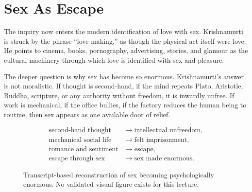 \documentclass[11pt,oneside]{book}
\begin{document}
\section{Sex As Escape}

The inquiry now enters the modern identification of love with sex. Krishnamurti is struck by the phrase ``love-making,'' as though the physical act itself were love. He points to cinema, books, pornography, advertising, stories, and glamour as the cultural machinery through which love is identified with sex and pleasure.

The deeper question is why sex has become so enormous. Krishnamurti's answer is not moralistic. If thought is second-hand, if the mind repeats Plato, Aristotle, Buddha, scripture, or any authority without freedom, it is inwardly unfree. If work is mechanical, if the office bullies, if the factory reduces the human being to routine, then sex appears as one available door of relief.

\begin{align}
\text{second-hand thought} &\longrightarrow \text{intellectual unfreedom},\\
\text{mechanical social life} &\longrightarrow \text{felt imprisonment},\\
\text{romance and sentiment} &\longrightarrow \text{escape},\\
\text{escape through sex} &\longrightarrow \text{sex made enormous}.
\end{align}

\begin{figure}
\centering
{}

Transcript-based reconstruction of sex becoming psychologically enormous. No validated visual figure exists for this lecture.
\end{figure}
\end{document}
